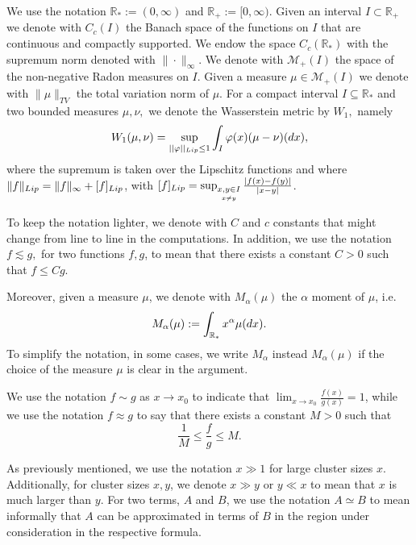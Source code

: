\documentclass[11pt]{article}
\numberwithin{equation}{section}
\theoremstyle{plain}
\newcommand{\der}{\textup{d}}
\begin{document}
We use the notation $\mathbb R_* :=(0, \infty )$ and $\mathbb R_+ :=[0, \infty ). $
Given an interval $I \subset \mathbb R_+ $ we denote with $C_c(I)$ the Banach space of the functions on $I$ that are continuous and compactly supported. We endow the space $C_c(\mathbb R_*)$ with the supremum norm denoted with $\|\cdot \|_\infty.$
We denote with $\mathcal M_+ (I)$ the space of the non-negative Radon measures on $I$. 
Given a measure $\mu \in \mathcal M_+(I)$ we  denote with $\|\mu \|_{TV}$ the total variation norm of $\mu.$
For a compact interval $I\subseteq\mathbb{R}_{\ast}$ and two bounded measures $\mu,\nu,$ we denote the Wasserstein metric by $W_{1},$ namely
 \begin{align}
W_{1}(\mu,\nu)=\sup_{||\varphi||_{\textup{Lip}}\leq 1}\int_{I}\varphi(x)(\mu-\nu)(\der x),\label{W metric}
\end{align}
 where the supremum is taken over the Lipschitz functions and where $\| f \|_{\textup{Lip}}=\|f\|_\infty + [f]_{\textup{Lip}}$, with $[f]_{\textup{Lip}}=\sup_{\underset{x\neq y}{x,y\in I}}\frac{|f(x)-f(y)|}{|x-y|}$.

To keep the notation lighter, we denote with $C$ and $c$ constants that might change from line to line in the computations. In addition, we use the notation $f\lesssim g,$ for two functions $f,g$, to mean that there exists a constant $C>0$ such that $f\leq C g$.

Moreover, given a measure $\mu$, we denote with $M_\alpha(\mu)$ the $\alpha$ moment of $\mu $, i.e.
\[
M_{\alpha} (\mu):=\int_{\mathbb R_*} x^\alpha \mu(\der x ). 
\] 
To simplify the notation, in some cases, we write $M_\alpha $ instead $M_\alpha (\mu) $ if the choice of the measure $\mu$ is clear in the argument.

We use the notation $f \sim g $ as $x \rightarrow x_0$ to indicate that $\lim_{x \rightarrow x_0} \frac{f(x)}{g(x)} =1$, while we use the notation $f \approx g $ to say that there exists a constant $M>0$ such that 
\[
\frac{1}{M } \leq \frac{f}{g} \leq M. 
\]


As previously mentioned, we use the notation $x\gg 1$ for large cluster sizes $x$. Additionally, for cluster sizes $x,y$,  we denote  $x\gg y$ or $y\ll x$ to mean that $x$ is much larger than $y$. For two terms, $A$ and $B$, we use the notation $A\simeq B$  to mean informally that $A$ can be approximated in terms of $B$ in the region under consideration in the respective formula.
\end{document}
